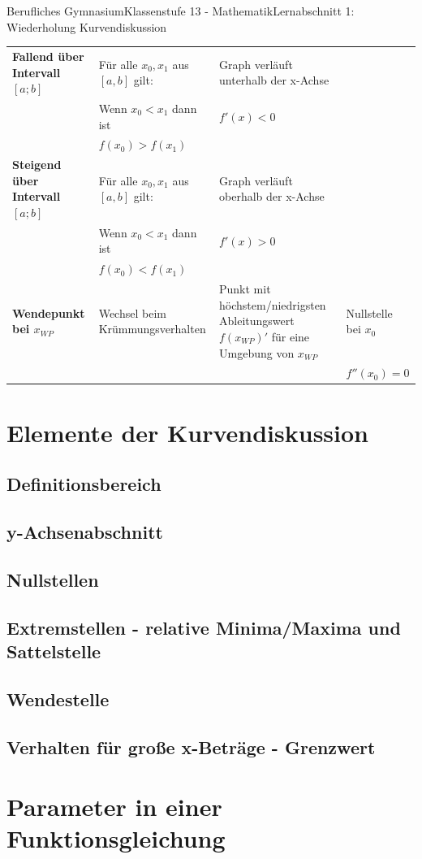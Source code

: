 \documentclass[11pt,twocolumn,oneside,openany,headings=optiontotoc,11pt,numbers=noenddot]{article}
\begin{document}
\begin{worksheet}{Berufliches Gymnasium}{Klassenstufe 13 - Mathematik}{Lernabschnitt 1: Wiederholung Kurvendiskussion}
\begin{tabularx}{\textwidth}{|X|X|X|X|}
			\hline
			\textbf{Fallend über Intervall \([a;b]\)} & Für alle \(x_0, x_1\) aus \([a,b]\) gilt: & Graph verläuft unterhalb der x-Achse & \\
			& Wenn \(x_0 < x_1\) dann ist & \(f'(x) < 0\) & \\
			& \(f(x_0) > f(x_1)\) & & \\
			\hline
			\textbf{Steigend über Intervall \([a;b]\)} & Für alle \(x_0, x_1\) aus \([a,b]\) gilt: & Graph verläuft oberhalb der x-Achse &\\
			& Wenn \(x_0 < x_1\) dann ist & \(f'(x) > 0\) & \\
			& \(f(x_0) < f(x_1)\) & & \\
			\hline
			\textbf{Wendepunkt bei \(x_{WP}\)} & Wechsel beim Krümmungsverhalten & Punkt mit höchstem/niedrigsten Ableitungswert \(f(x_{WP})'\) für eine Umgebung von \(x_{WP}\) & Nullstelle bei \(x_0\)\\
			& & & \(f''(x_0) = 0\)\\
			\hline
		\end{tabularx}
		\par\bigskip\noindent
		\clearpage
		\setlength{\columnseprule}{0.1pt}
		\section{Elemente der Kurvendiskussion}
		\subsection{Definitionsbereich}
		\subsection{y-Achsenabschnitt}
		\subsection{Nullstellen}
		\subsection{Extremstellen - relative Minima/Maxima und Sattelstelle}
		\subsection{Wendestelle}
		\subsection{Verhalten für große x-Beträge - Grenzwert}
		\section{Parameter in einer Funktionsgleichung}
	\end{worksheet}
\end{document}
